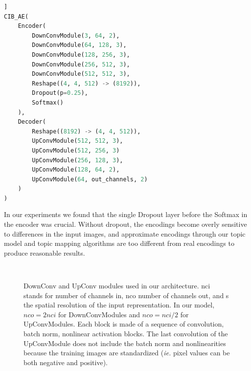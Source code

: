 \begin{appendices}
\begin{lstlisting}[language=Python, caption=CIB-AE Architecture Detail, label=cibae_arch]]
CIB_AE(
    Encoder(
        DownConvModule(3, 64, 2),
        DownConvModule(64, 128, 3),
        DownConvModule(128, 256, 3),
        DownConvModule(256, 512, 3),
        DownConvModule(512, 512, 3),
        Reshape((4, 4, 512) -> (8192)),
        Dropout(p=0.25),
        Softmax()
    ), 
    Decoder(
        Reshape((8192) -> (4, 4, 512)),
        UpConvModule(512, 512, 3),
        UpConvModule(512, 256, 3)
        UpConvModule(256, 128, 3),
        UpConvModule(128, 64, 2),
        UpConvModule(64, out_channels, 2)
    )
)
\end{lstlisting}

In our experiments we found that the single Dropout layer before the Softmax in the encoder was crucial. Without dropout, the encodings become overly sensitive to differences in the input images, and approximate encodings through our topic model and topic mapping algorithms are too different from real encodings to produce reasonable results.

\begin{figure}
    \begin{center}
    \\
    \end{center}
    \caption{
    \protect{} DownConv and \protect{} UpConv modules used in our architecture. nci stands for number of channels in, nco number of channels out, and s the spatial resolution of the input representation. In our model, $nco = 2 nci$ for DownConvModules and $nco = nci/2$ for UpConvModules. Each block is made of a sequence of convolution, batch norm, nonlinear activation blocks. The last convolution of the UpConvModule does not include the batch norm and nonlinearities because the training images are standardized (\emph{ie.} pixel values can be both negative and positive).
    }
    \label{fig:cib-ae_modules}
\end{figure}


\end{appendices}
